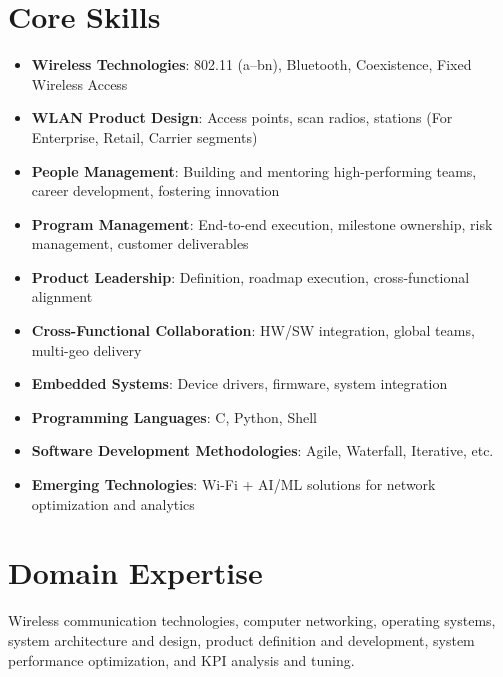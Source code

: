 \documentclass[a4paper,11pt]{article}
\begin{document}
\section*{Core Skills}
\begin{itemize}
    \item \textbf{Wireless Technologies}: 802.11 (a--bn), Bluetooth, Coexistence, Fixed Wireless Access
    \item \textbf{WLAN Product Design}: Access points, scan radios, stations (For Enterprise, Retail, Carrier segments)
    \item \textbf{People Management}: Building and mentoring high-performing teams, career development, fostering innovation
    \item \textbf{Program Management}: End-to-end execution, milestone ownership, risk management, customer deliverables
    \item \textbf{Product Leadership}: Definition, roadmap execution, cross-functional alignment
    \item \textbf{Cross-Functional Collaboration}: HW/SW integration, global teams, multi-geo delivery
    \item \textbf{Embedded Systems}: Device drivers, firmware, system integration
    \item \textbf{Programming Languages}: C, Python, Shell
    \item \textbf{Software Development Methodologies}: Agile, Waterfall, Iterative, etc.
    \item \textbf{Emerging Technologies}: Wi-Fi + AI/ML solutions for network optimization and analytics
\end{itemize}



\section*{Domain Expertise}
\begin{flushleft}
Wireless communication technologies, computer networking, operating systems, system architecture and design, product definition and development, system performance optimization, and KPI analysis and tuning.
\end{flushleft}



\end{document}
